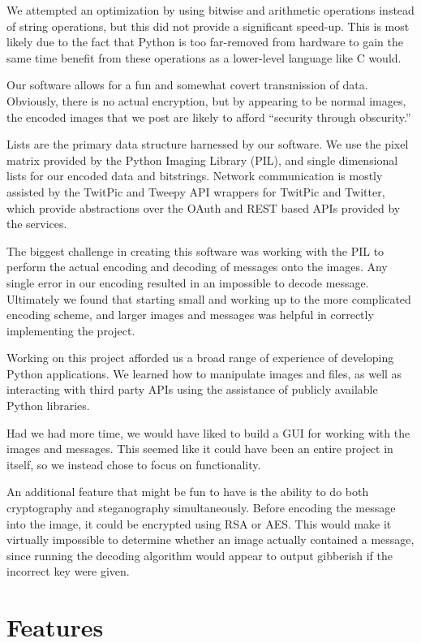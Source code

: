 \documentclass[11pt]{article}
\begin{document}
  We attempted an optimization by using bitwise and arithmetic operations
  instead of string operations, but this did not provide a significant
  speed-up. This is most likely due to the fact that Python is too
  far-removed from hardware to gain the same time benefit from these operations
  as a lower-level language like C would.

  Our software allows for a fun and somewhat covert transmission of
  data. Obviously, there is no actual encryption, but by appearing to
  be normal images, the encoded images that we post are likely to
  afford ``security through obscurity.''

  Lists are the primary data structure harnessed by our software. We
  use the pixel matrix provided by the Python Imaging Library (PIL), and
  single dimensional lists for our encoded data and
  bitstrings. Network communication is mostly assisted by the TwitPic
  and Tweepy API wrappers for TwitPic and Twitter, which provide
  abstractions over the OAuth and REST based APIs provided by the
  services.

  The biggest challenge in creating this software was working with the
  PIL to perform the actual encoding and decoding of messages onto the
  images. Any single error in our encoding resulted in an impossible
  to decode message. Ultimately we found that starting small and
  working up to the more complicated encoding scheme, and larger images
  and messages was helpful in correctly implementing the project.

  Working on this project afforded us a broad range of experience of
  developing Python applications. We learned how to manipulate images
  and files, as well as interacting with third party APIs using the
  assistance of publicly available Python libraries.

  Had we had more time, we would have liked to build a GUI for working
  with the images and messages. This seemed like it could have been an
  entire project in itself, so we instead chose to focus on
  functionality.

  An additional feature that might be fun to have is the ability to do
  both cryptography and steganography simultaneously. Before encoding the
  message into the image, it could be encrypted using RSA or AES. This
  would make it virtually impossible to determine whether an image actually
  contained a message, since running the decoding algorithm would appear
  to output gibberish if the incorrect key were given.

\section{Features}
\label{sec-4}
\end{document}
